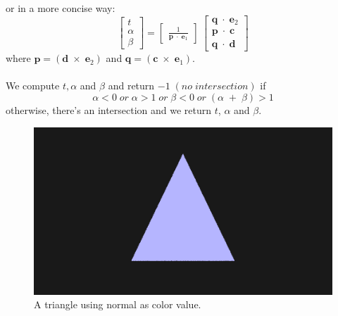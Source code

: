 \documentclass[11pt,a4paper]{article}
\begin{document}
	or in a more concise way:
	\[
	\begin{bmatrix}
	t \\
	\alpha \\
	\beta 
	\end{bmatrix} = \left[
	\begin{array}{ccc}
	\frac{1}{\boldsymbol{p}\;\cdot\;\boldsymbol{e}_{1}}
	\end{array}
	\right]
	\
	\begin{bmatrix}
	\boldsymbol{q}\;\cdot\;\boldsymbol{e}_{2} \\
	\boldsymbol{p}\;\cdot\;\boldsymbol{c} \\
	\boldsymbol{q}\;\cdot\;\boldsymbol{d}
	\end{bmatrix}
	\]
	where $\boldsymbol{p}=(\boldsymbol{d}\;\times\;\boldsymbol{e}_{2})$ and $\boldsymbol{q}=(\boldsymbol{c}\;\times\;\boldsymbol{e}_{1})$.\\~\\
	We compute $t, \alpha$ and $\beta$ and return $-1\;(no\;intersection)$ if 
	\begin{equation}
		\alpha<0\;or\;\alpha>1\;or\;\beta<0\;or\;(\alpha\;+\;\beta)>1
	\end{equation}
	otherwise, there's an intersection and we return $t$, $\alpha$ and $\beta$.
	\begin{figure}[htp]
		\centering
		\includegraphics[width=.45\textwidth]{ray_triangle.png}\quad
		\caption{A triangle using normal as color value.}
	\end{figure}
\end{document}
